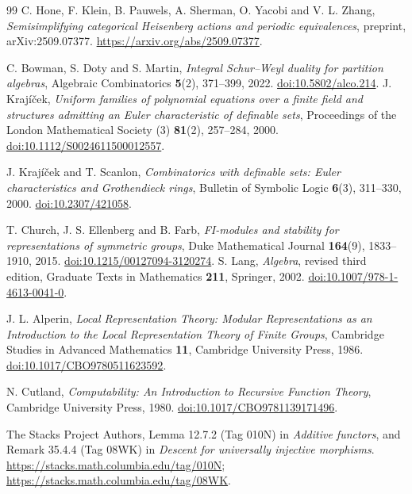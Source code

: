 \begin{thebibliography}{99}
C. Hone, F. Klein, B. Pauwels, A. Sherman, O. Yacobi and V. L. Zhang,
\emph{Semisimplifying categorical Heisenberg actions and periodic equivalences}, preprint,
arXiv:2509.07377.
\url{https://arxiv.org/abs/2509.07377}.

C. Bowman, S. Doty and S. Martin, \emph{Integral Schur--Weyl duality for
partition algebras}, Algebraic Combinatorics \textbf{5}(2), 371--399, 2022.
\href{https://doi.org/10.5802/alco.214}{doi:10.5802/alco.214}.
J. Kraj\'i\v cek, \emph{Uniform families of polynomial equations over a
finite field and structures admitting an Euler characteristic of definable
sets}, Proceedings of the London Mathematical Society (3)
\textbf{81}(2), 257--284, 2000.
\href{https://doi.org/10.1112/S0024611500012557}{doi:10.1112/S0024611500012557}.

J. Kraj\'i\v cek and T. Scanlon, \emph{Combinatorics with definable sets:
Euler characteristics and Grothendieck rings}, Bulletin of Symbolic Logic
\textbf{6}(3), 311--330, 2000.
\href{https://doi.org/10.2307/421058}{doi:10.2307/421058}.

T. Church, J. S. Ellenberg and B. Farb, \emph{FI-modules and stability
for representations of symmetric groups}, Duke Mathematical Journal
\textbf{164}(9), 1833--1910, 2015.
\href{https://doi.org/10.1215/00127094-3120274}{doi:10.1215/00127094-3120274}.
S. Lang, \emph{Algebra}, revised third edition,
Graduate Texts in Mathematics \textbf{211}, Springer, 2002.
\href{https://doi.org/10.1007/978-1-4613-0041-0}{doi:10.1007/978-1-4613-0041-0}.

J. L. Alperin, \emph{Local Representation Theory:
Modular Representations as an Introduction to the Local
Representation Theory of Finite Groups},
Cambridge Studies in Advanced Mathematics \textbf{11},
Cambridge University Press, 1986.
\href{https://doi.org/10.1017/CBO9780511623592}{doi:10.1017/CBO9780511623592}.

N. Cutland, \emph{Computability: An Introduction to Recursive
Function Theory}, Cambridge University Press, 1980.
\href{https://doi.org/10.1017/CBO9781139171496}{doi:10.1017/CBO9781139171496}.

The Stacks Project Authors,
Lemma 12.7.2 (Tag 010N) in \emph{Additive functors}, and
Remark 35.4.4 (Tag 08WK) in \emph{Descent for universally injective morphisms}.
\url{https://stacks.math.columbia.edu/tag/010N};
\url{https://stacks.math.columbia.edu/tag/08WK}.


\end{thebibliography}
